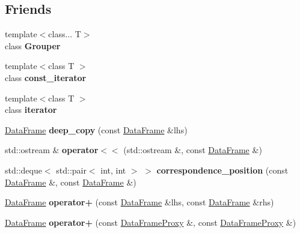 \subsection*{Friends}
\begin{DoxyCompactItemize}
\item 
\mbox{\label{classDataFrame_a6d45f85447b7949ec8832150ebaf26cc}} 
{\footnotesize template$<$class... T$>$ }\\class {\bfseries Grouper}
\item 
\mbox{\label{classDataFrame_ada44a7c9690829a06c00c22a3ea6fba1}} 
{\footnotesize template$<$class T $>$ }\\class {\bfseries const\+\_\+iterator}
\item 
\mbox{\label{classDataFrame_af4b62491a63a70a7f86bb7425fb5b484}} 
{\footnotesize template$<$class T $>$ }\\class {\bfseries iterator}
\item 
\mbox{\label{classDataFrame_ac665e1df1c1d41e0d0c5afcdfb827a74}} 
\hyperlink{classDataFrame}{Data\+Frame} {\bfseries deep\+\_\+copy} (const \hyperlink{classDataFrame}{Data\+Frame} \&lhs)
\item 
\mbox{\label{classDataFrame_a7372e1909f73624de2939188c8b407bd}} 
std\+::ostream \& {\bfseries operator$<$$<$} (std\+::ostream \&, const \hyperlink{classDataFrame}{Data\+Frame} \&)
\item 
\mbox{\label{classDataFrame_a9eddb94ec11871497eb1ecbd4b9d781d}} 
std\+::deque$<$ std\+::pair$<$ int, int $>$ $>$ {\bfseries correspondence\+\_\+position} (const \hyperlink{classDataFrame}{Data\+Frame} \&, const \hyperlink{classDataFrame}{Data\+Frame} \&)
\item 
\mbox{\label{classDataFrame_a1b618c630383343b0476d4b2ee3892ba}} 
\hyperlink{classDataFrame}{Data\+Frame} {\bfseries operator+} (const \hyperlink{classDataFrame}{Data\+Frame} \&lhs, const \hyperlink{classDataFrame}{Data\+Frame} \&rhs)
\item 
\mbox{\label{classDataFrame_ac7252ac5b8145feb97ce0b16040cdbde}} 
\hyperlink{classDataFrame}{Data\+Frame} {\bfseries operator+} (const \hyperlink{classDataFrame_1_1DataFrameProxy}{Data\+Frame\+Proxy} \&, const \hyperlink{classDataFrame_1_1DataFrameProxy}{Data\+Frame\+Proxy} \&)

\end{DoxyCompactItemize}
